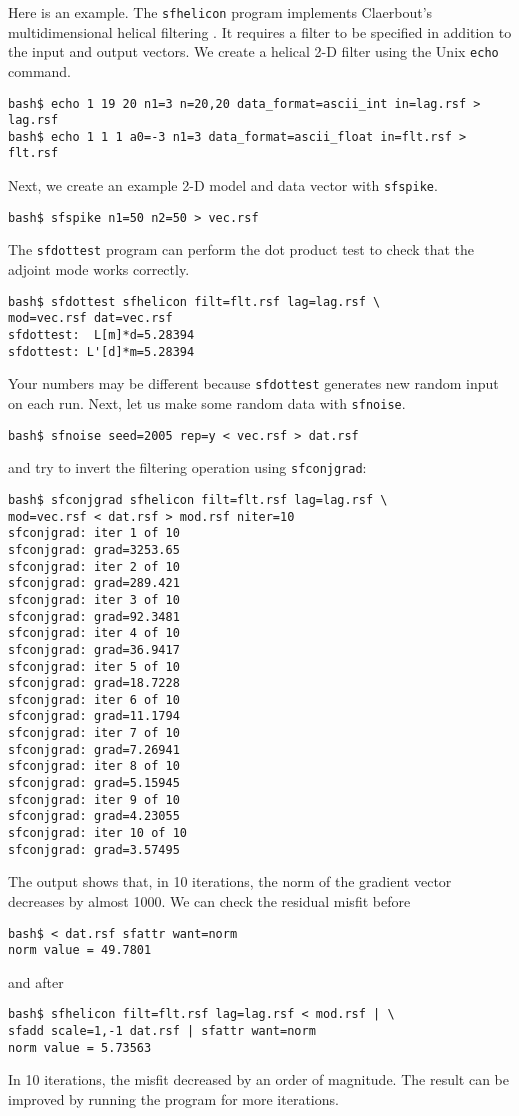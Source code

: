 Here is an example. The \texttt{sfhelicon}
program implements Claerbout's multidimensional helical filtering
\cite[]{GEO63-05-15321541}. It requires a filter to be specified in
addition to the input and output vectors. We create a helical 
2-D filter using the Unix \texttt{echo} command.
\begin{verbatim}
bash$ echo 1 19 20 n1=3 n=20,20 data_format=ascii_int in=lag.rsf > lag.rsf
bash$ echo 1 1 1 a0=-3 n1=3 data_format=ascii_float in=flt.rsf > flt.rsf
\end{verbatim}
Next, we create an example 2-D model and data vector with \texttt{sfspike}.
\begin{verbatim}
bash$ sfspike n1=50 n2=50 > vec.rsf
\end{verbatim}
The \texttt{sfdottest} program can perform the dot product test to
check that the adjoint mode works correctly.
\begin{verbatim}
bash$ sfdottest sfhelicon filt=flt.rsf lag=lag.rsf \
mod=vec.rsf dat=vec.rsf
sfdottest:  L[m]*d=5.28394
sfdottest: L'[d]*m=5.28394
\end{verbatim}
Your numbers may be different because \texttt{sfdottest} generates new
random input on each run.
Next, let us make some random data with \texttt{sfnoise}.
\begin{verbatim}
bash$ sfnoise seed=2005 rep=y < vec.rsf > dat.rsf
\end{verbatim}
and try to invert the filtering operation using \texttt{sfconjgrad}:
\begin{verbatim}
bash$ sfconjgrad sfhelicon filt=flt.rsf lag=lag.rsf \
mod=vec.rsf < dat.rsf > mod.rsf niter=10
sfconjgrad: iter 1 of 10
sfconjgrad: grad=3253.65
sfconjgrad: iter 2 of 10
sfconjgrad: grad=289.421
sfconjgrad: iter 3 of 10
sfconjgrad: grad=92.3481
sfconjgrad: iter 4 of 10
sfconjgrad: grad=36.9417
sfconjgrad: iter 5 of 10
sfconjgrad: grad=18.7228
sfconjgrad: iter 6 of 10
sfconjgrad: grad=11.1794
sfconjgrad: iter 7 of 10
sfconjgrad: grad=7.26941
sfconjgrad: iter 8 of 10
sfconjgrad: grad=5.15945
sfconjgrad: iter 9 of 10
sfconjgrad: grad=4.23055
sfconjgrad: iter 10 of 10
sfconjgrad: grad=3.57495
\end{verbatim}
The output shows that, in 10 iterations, the norm of the gradient vector decreases by almost 1000. 
We can check the residual misfit before
\begin{verbatim}
bash$ < dat.rsf sfattr want=norm
norm value = 49.7801
\end{verbatim}
and after
\begin{verbatim}
bash$ sfhelicon filt=flt.rsf lag=lag.rsf < mod.rsf | \
sfadd scale=1,-1 dat.rsf | sfattr want=norm
norm value = 5.73563
\end{verbatim}
In 10 iterations, the misfit decreased by an order of magnitude. The
result can be improved by running the program for more iterations.

